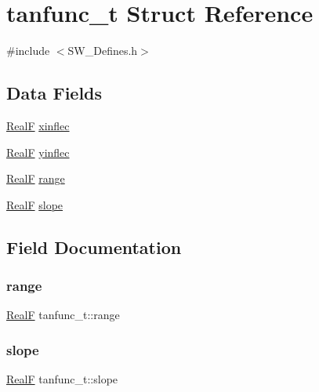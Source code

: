 \hypertarget{structtanfunc__t}{}\section{tanfunc\+\_\+t Struct Reference}
\label{structtanfunc__t}


{\ttfamily \#include $<$S\+W\+\_\+\+Defines.\+h$>$}

\subsection*{Data Fields}
\begin{DoxyCompactItemize}
\item 
\hyperlink{generic_8h_a94d667c93da0511f21142d988f67674f}{RealF} \hyperlink{structtanfunc__t_af302497555fcc6e85d0e5f5aff7a0751}{xinflec}
\item 
\hyperlink{generic_8h_a94d667c93da0511f21142d988f67674f}{RealF} \hyperlink{structtanfunc__t_a7b917642c1d68005c5fc6f055ef7024d}{yinflec}
\item 
\hyperlink{generic_8h_a94d667c93da0511f21142d988f67674f}{RealF} \hyperlink{structtanfunc__t_a19c51d283c353fdce3d5b1ad305efdb2}{range}
\item 
\hyperlink{generic_8h_a94d667c93da0511f21142d988f67674f}{RealF} \hyperlink{structtanfunc__t_a6517acc9d0c732fbb6cb8cfafe22a4cd}{slope}
\end{DoxyCompactItemize}


\subsection{Field Documentation}
\mbox{\label{structtanfunc__t_a19c51d283c353fdce3d5b1ad305efdb2}} 
\subsubsection{\texorpdfstring{range}{range}}
{\footnotesize\ttfamily \hyperlink{generic_8h_a94d667c93da0511f21142d988f67674f}{RealF} tanfunc\+\_\+t\+::range}

\mbox{\label{structtanfunc__t_a6517acc9d0c732fbb6cb8cfafe22a4cd}} 
\subsubsection{\texorpdfstring{slope}{slope}}
{\footnotesize\ttfamily \hyperlink{generic_8h_a94d667c93da0511f21142d988f67674f}{RealF} tanfunc\+\_\+t\+::slope}

